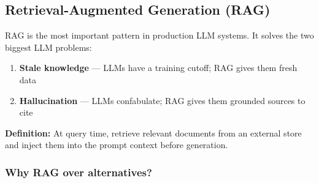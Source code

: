 \documentclass[11pt]{article}
\providecommand{\tightlist}{\setlength{\itemsep}{1pt}\setlength{\parskip}{0pt}}
\begin{document}
\subsection{Retrieval-Augmented Generation (RAG)}\label{retrieval-augmented-generation-rag}


RAG is the most important pattern in production LLM systems. It solves the two biggest LLM problems:

\begin{enumerate}
\def\labelenumi{\arabic{enumi}.}
\tightlist
\item
  \textbf{Stale knowledge} --- LLMs have a training cutoff; RAG gives them fresh data
\item
  \textbf{Hallucination} --- LLMs confabulate; RAG gives them grounded sources to cite
\end{enumerate}

\textbf{Definition:} At query time, retrieve relevant documents from an external store and inject them into the prompt context before generation.

\subsubsection{Why RAG over alternatives?}\label{why-rag-over-alternatives}
\end{document}
